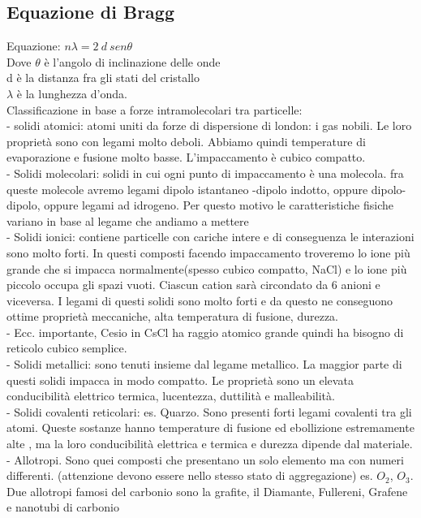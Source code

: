 \subsection{Equazione di Bragg}
Equazione: $n\lambda = 2\ d\ sen\theta$\\
Dove $\theta$ è l’angolo di inclinazione delle onde\\
d è la distanza fra gli stati del cristallo \\
$\lambda$ è la lunghezza d’onda.\\
Classificazione in base a forze intramolecolari tra particelle:\\
\tab- solidi atomici: atomi uniti da forze di dispersione di london: i gas nobili. Le loro proprietà sono con legami molto deboli. Abbiamo quindi temperature di evaporazione e fusione molto basse. L’impaccamento è cubico compatto.\\
\tab- Solidi molecolari: solidi in cui ogni punto di impaccamento è una molecola. fra queste molecole avremo legami dipolo istantaneo -dipolo indotto, oppure dipolo-dipolo, oppure legami ad idrogeno. Per questo motivo le caratteristiche fisiche variano in base al legame che andiamo a mettere\\
\tab- Solidi ionici: contiene particelle con cariche intere e di conseguenza le interazioni sono molto forti. In questi composti facendo impaccamento troveremo lo ione più grande che si impacca normalmente(spesso cubico compatto, NaCl) e lo ione più piccolo occupa gli spazi vuoti. Ciascun cation sarà circondato da 6 anioni e viceversa. I legami di questi solidi sono molto forti e da questo ne conseguono ottime proprietà meccaniche, alta temperatura di fusione, durezza.\\
\tab\tab- Ecc. importante, Cesio in CsCl ha raggio atomico grande quindi ha bisogno di reticolo cubico semplice.\\
\tab- Solidi metallici: sono tenuti insieme dal legame metallico. La maggior parte di questi solidi impacca in modo compatto. Le proprietà sono un elevata conducibilità elettrico termica, lucentezza, duttilità e malleabilità. \\
\tab- Solidi covalenti reticolari: es. Quarzo. Sono presenti forti legami covalenti tra gli atomi. Queste sostanze hanno temperature di fusione ed ebollizione estremamente alte , ma la loro conducibilità elettrica e termica e durezza dipende dal materiale. \\
\tab\tab- Allotropi. Sono quei composti che presentano un solo elemento ma con numeri differenti. (attenzione devono essere nello stesso stato di aggregazione) es. $O_2$, $O_3$. Due allotropi famosi del carbonio sono la grafite, il Diamante, Fullereni, Grafene e nanotubi di carbonio\\
